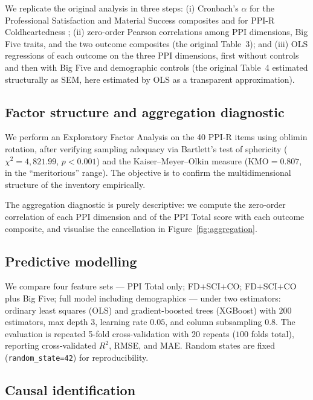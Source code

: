 \documentclass[11pt,a4paper]{article}
\begin{document}
We replicate the original analysis in three steps: (i) Cronbach's
$\alpha$ for the Professional Satisfaction and Material Success
composites and for PPI-R Coldheartedness \citep{cronbach1951};
(ii) zero-order Pearson correlations among PPI dimensions, Big Five
traits, and the two outcome composites (the original Table~3); and
(iii) OLS regressions of each outcome on the three PPI dimensions,
first without controls and then with Big Five and demographic
controls (the original Table~4 estimated structurally as SEM, here
estimated by OLS as a transparent approximation).

\subsection{Factor structure and aggregation diagnostic}
\label{sec:method-efa}

We perform an Exploratory Factor Analysis on the 40 PPI-R items
using oblimin rotation, after verifying sampling adequacy via
Bartlett's test of sphericity ($\chi^2 = 4{,}821.99$, $p < 0.001$)
and the Kaiser--Meyer--Olkin measure ($\text{KMO} = 0.807$, in the
``meritorious'' range). The objective is to confirm the
multidimensional structure of the inventory empirically.

The aggregation diagnostic is purely descriptive: we compute the
zero-order correlation of each PPI dimension and of the PPI Total
score with each outcome composite, and visualise the cancellation in
Figure~\ref{fig:aggregation}.

\subsection{Predictive modelling}
\label{sec:method-pred}

We compare four feature sets ---  PPI Total only; FD$+$SCI$+$CO;
FD$+$SCI$+$CO plus Big Five; full model including
demographics --- under two estimators: ordinary least squares (OLS)
and gradient-boosted trees (XGBoost) with $200$ estimators, max depth
$3$, learning rate $0.05$, and column subsampling $0.8$. The
evaluation is repeated 5-fold cross-validation with $20$ repeats
($100$ folds total), reporting cross-validated $R^2$, RMSE, and MAE.
Random states are fixed (\texttt{random\_state=42}) for
reproducibility.

\subsection{Causal identification}
\label{sec:method-causal}
\end{document}
